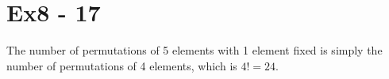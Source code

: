 \section*{Ex8 - 17}
The number of permutations of 5 elements with 1 element fixed is simply the number of permutations of 4 elements, which is $ 4! = 24 $.